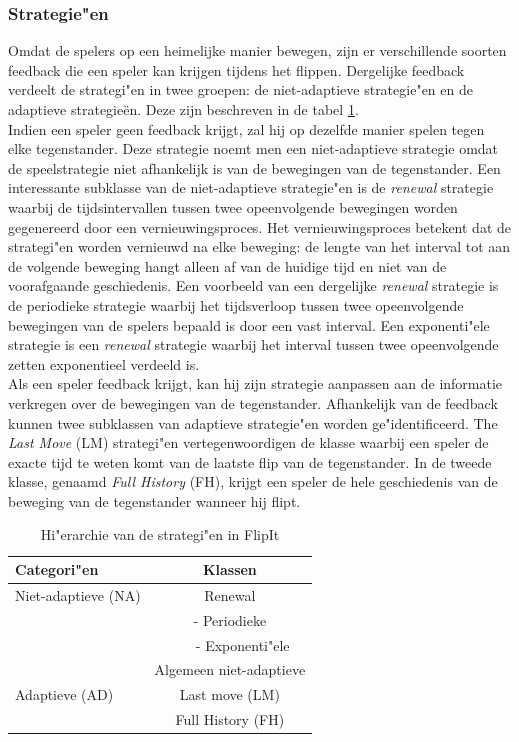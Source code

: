 \documentclass[master=cws, masteroption=vs,english]{kulemt}
\begin{document}
\begin{abstract*}
\subsubsection{Strategie"en}
Omdat de spelers op een heimelijke manier bewegen, zijn er verschillende soorten feedback die een speler kan krijgen tijdens het flippen. Dergelijke feedback verdeelt de strategi"en in twee groepen: de niet-adaptieve strategie"en en de adaptieve strategie\"en. Deze zijn beschreven in de tabel \ref{tabel: Strategies}. \\

Indien een speler geen feedback krijgt, zal hij op dezelfde manier spelen tegen elke tegenstander. Deze strategie noemt men een niet-adaptieve strategie omdat de speelstrategie niet afhankelijk is van de bewegingen van de tegenstander. Een interessante subklasse van de niet-adaptieve strategie"en is de \textit{renewal} strategie waarbij de tijdsintervallen tussen twee opeenvolgende bewegingen worden gegenereerd door een vernieuwingsproces. 
Het vernieuwingsproces betekent dat de strategi"en worden vernieuwd na elke beweging: de lengte van het interval tot aan de volgende beweging hangt alleen af van de huidige tijd en niet van de voorafgaande geschiedenis. Een voorbeeld van een dergelijke \textit{renewal} strategie is de periodieke strategie waarbij het tijdsverloop tussen twee opeenvolgende bewegingen van de spelers bepaald is door een vast interval. Een exponenti"ele strategie is een \textit{renewal} strategie waarbij het interval tussen twee opeenvolgende zetten exponentieel verdeeld is. \\

Als een speler feedback krijgt, kan hij zijn strategie aanpassen aan de informatie verkregen over de bewegingen van de tegenstander. Afhankelijk van de feedback kunnen twee subklassen van adaptieve strategie"en worden ge"identificeerd. The \textit{Last Move} (LM) strategi"en vertegenwoordigen de klasse waarbij een speler de exacte tijd te weten komt van de laatste flip van de tegenstander. In de tweede klasse, genaamd \textit{Full History} (FH),  krijgt een speler de hele geschiedenis van de beweging van de tegenstander wanneer hij flipt. \\


 \begin{table}
 \center
 \begin {tabular} {l | c}
  \textbf{Categori"en} & \textbf{Klassen} \\
  \hline Niet-adaptieve (NA) & Renewal \\
  & - Periodieke \\
  & ~~~ - Exponenti"ele \\
  & Algemeen niet-adaptieve \\
  \hline Adaptieve (AD) & Last move (LM) \\
  & Full History (FH) \\
\end{tabular}
 \caption{Hi"erarchie van de strategi"en in FlipIt}
 \label{tabel: Strategies}
 \end{table}



\end{abstract*}
\end{document}
